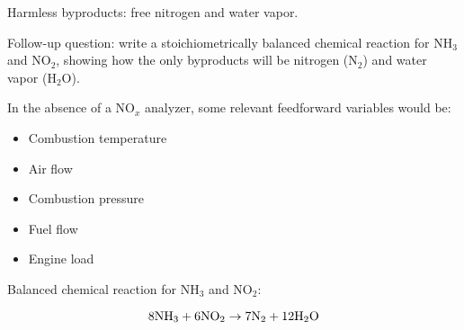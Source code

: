 





Harmless byproducts: free nitrogen and water vapor.

\vskip 10pt

Follow-up question: write a stoichiometrically balanced chemical reaction for NH$_{3}$ and NO$_{2}$, showing how the only byproducts will be nitrogen (N$_{2}$) and water vapor (H$_{2}$O).







In the absence of a NO$_{x}$ analyzer, some relevant feedforward variables would be:

\begin{itemize}
\item{} Combustion temperature
\item{} Air flow
\item{} Combustion pressure
\item{} Fuel flow
\item{} Engine load
\end{itemize}

\vskip 10pt

Balanced chemical reaction for NH$_{3}$ and NO$_{2}$:

$$8\hbox{NH}_3 + 6\hbox{NO}_2 \to 7\hbox{N}_2 + 12\hbox{H}_2\hbox{O}$$





